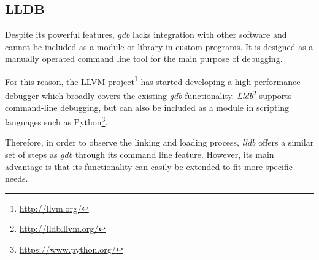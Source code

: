 \subsection{LLDB}
\label{sub-sec:lldb}

Despite its powerful features, \textit{gdb} lacks integration with other software and cannot be included as a module or library in custom programs. It is designed as a manually operated command line tool for the main purpose of debugging.

For this reason, the LLVM project\footnote{\url{http://llvm.org/}} has started developing a high performance debugger which broadly covers the existing \textit{gdb} functionality. \textit{Lldb}\footnote{\url{http://lldb.llvm.org/}} supports command-line debugging, but can also be included as a module in scripting languages such as Python\footnote{\url{https://www.python.org/}}.

Therefore, in order to observe the linking and loading process, \textit{lldb} offers a similar set of steps as \textit{gdb} through its command line feature. However, its main advantage is that its functionality can easily be extended to fit more specific needs.

